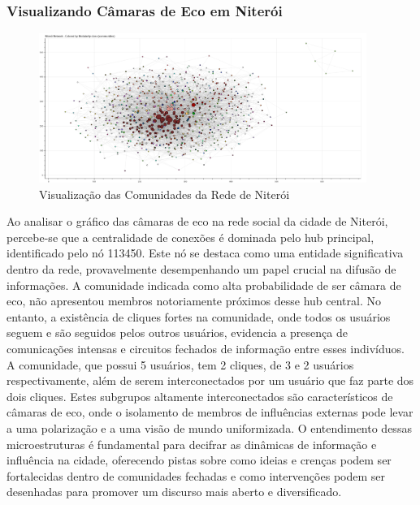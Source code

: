 \subsubsection*{Visualizando Câmaras de Eco em Niterói}

\begin{figure}[htb]
	\centering
	\includegraphics[width=0.95\textwidth]{images/network_communities_niteroi.png}
	\caption{Visualização das Comunidades da Rede de Niterói}
	\label{fig:network_communities_niteroi}
\end{figure}

Ao analisar o gráfico das câmaras de eco na rede social da cidade de Niterói, percebe-se que a centralidade de conexões é dominada pelo hub principal, identificado pelo nó 113450. Este nó se destaca como uma entidade significativa dentro da rede, provavelmente desempenhando um papel crucial na difusão de informações. A comunidade indicada como alta probabilidade de ser câmara de eco, não apresentou membros notoriamente próximos desse hub central. No entanto, a existência de cliques fortes na comunidade, onde todos os usuários seguem e são seguidos pelos outros usuários, evidencia a presença de comunicações intensas e circuitos fechados de informação entre esses indivíduos. A comunidade, que possui 5 usuários, tem 2 cliques, de 3 e 2 usuários respectivamente, além de serem interconectados por um usuário que faz parte dos dois cliques. Estes subgrupos altamente interconectados são característicos de câmaras de eco, onde o isolamento de membros de influências externas pode levar a uma polarização e a uma visão de mundo uniformizada. O entendimento dessas microestruturas é fundamental para decifrar as dinâmicas de informação e influência na cidade, oferecendo pistas sobre como ideias e crenças podem ser fortalecidas dentro de comunidades fechadas e como intervenções podem ser desenhadas para promover um discurso mais aberto e diversificado.

